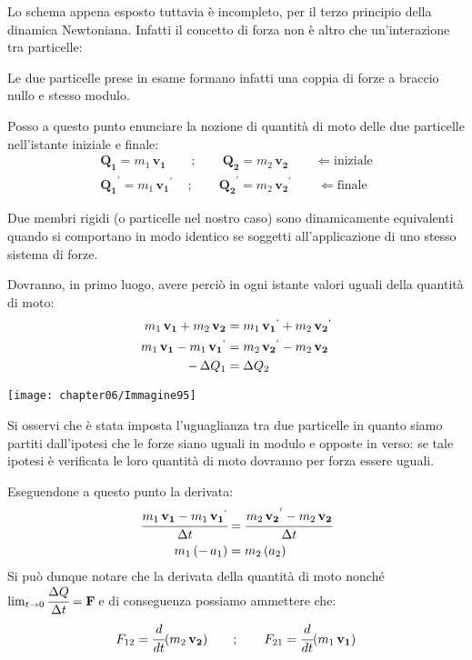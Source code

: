 	Lo schema appena esposto tuttavia è incompleto, per il terzo principio della dinamica Newtoniana. Infatti il concetto di forza non è altro che un'interazione tra particelle:
	\vspace{1mm}
	
	\begin{minipage}{.5\textwidth}
	Le due particelle prese in esame formano infatti una coppia di forze a braccio nullo e stesso modulo.
	
	Posso a questo punto enunciare la nozione di quantità di moto delle due particelle nell'istante iniziale e finale:
	\begin{gather*}
		\mathbf{Q_1} = m_1\,\mathbf{v_1}\qquad;\qquad\mathbf{Q_2} = m_2\,\mathbf{v_2}\qquad\Leftarrow\text{iniziale}\\
		\mathbf{Q_1}^{'} = m_1\,\mathbf{v_1}^{'}\,\quad;\qquad\mathbf{Q_2}^{'} = m_2\,\mathbf{v_2}^{'}\qquad\Leftarrow\text{finale}
	\end{gather*}
	
	Due membri rigidi (o particelle nel nostro caso) sono dinamicamente equivalenti quando si comportano in modo identico se soggetti all'applicazione di uno stesso sistema di forze.
	
	Dovranno, in primo luogo, avere perciò in ogni istante valori uguali della quantità di moto:
	\begin{align*}
	m_1\,\mathbf{v_1} + m_2\,\mathbf{v_2} &= m_1\,\mathbf{v_1}^{`} + m_2\,\mathbf{v_2}^{`}\\
	m_1\,\mathbf{v_1} - m_1\,\mathbf{v_1}^{`} &= m_2\,\mathbf{v_2}^{`} - m_2\,\mathbf{v_2}\\
	-\,\Delta Q_1 &= \Delta Q_2
 	\end{align*}
	\end{minipage}
	\hfill
	\begin{minipage}{.5\textwidth}
	\centering
	\texttt{[image: chapter06/Immagine95]}
	\end{minipage}
	\vspace{1mm}
	
Si osservi che è stata imposta l'uguaglianza tra due particelle in quanto siamo partiti dall'ipotesi che le forze siano uguali in modulo e opposte in verso: se tale ipotesi è verificata le loro quantità di moto dovranno per forza essere uguali.
	
	Eseguendone a questo punto la derivata:
	\begin{align*}
	\cfrac{m_1\,\mathbf{v_1} - m_1\,\mathbf{v_1}^{`}}{\Delta t} &= \cfrac{m_2\,\mathbf{v_2}^{'} - m_2\,\mathbf{v_2}}{\Delta t}\\
	m_1\,(-\,a_1) &= m_2\,(a_2)
	\end{align*}
	Si può dunque notare che la derivata della quantità di moto nonché $\lim_{t \to 0} \cfrac{\Delta Q}{\Delta t} = \mathbf{F}$\,e di conseguenza possiamo ammettere che:
	\begin{gather*}
	F_{12} = \cfrac{d}{dt}(m_2\,\mathbf{v_2})\qquad;\qquad F_{21} = \cfrac{d}{dt}(m_1\,\mathbf{v_1})
	\end{gather*}
	
